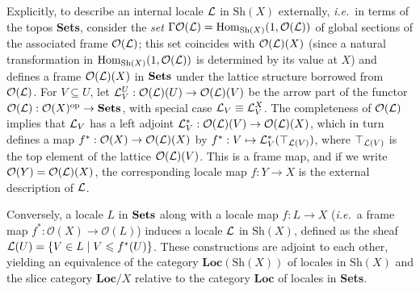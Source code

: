 \documentclass[11pt]{article}
\newcommand{\Sets}{\mbox{\textbf{Sets}}}
\newcommand{\raw}{\rightarrow} \newcommand{\rat}{\mapsto}
\newcommand{\CO}{{\mathcal O}} \newcommand{\CP}{{\mathcal P}}
\newcommand{\Sh}{\ensuremath{\mathrm{Sh}}}
\newcommand{\ie}{\textit{i.e.}}
\begin{document}
Explicitly,  to describe an internal locale ${\mathcal L}$ in $\Sh(X)$
externally, \ie\ in terms of the topos \Sets, consider the {\it set}
$\Gm\CO(\CL)=\mathrm{Hom}_{\Sh(X)}(1,\CO(\CL))$  of global sections of the
associated frame $\CO(\CL)$; this set coincides with $\CO(\CL)(X)$ 
(since a
natural transformation in $\mathrm{Hom}_{\Sh(X)}(1,\CO(\CL))$  is determined by its value at $X$)
and defines a frame $\CO(\CL)(X)$  in $\Sets$ under the lattice structure borrowed
from $\CO(\CL)$. For $V\subseteq U$, let $\CL^U_V:
\CO(\CL)(U)\raw \CO(\CL)(V)$ be the
arrow part of the functor $\CO(\CL):\CO(X)^{\mathrm{op}}\raw\Sets$, with
special case ${\mathcal L}_V\equiv{\mathcal L}^X_V$. The completeness of $\CO(\CL)$ implies
that ${\mathcal L}_V$ has a left adjoint $\CL^*_V:\CO(\CL)(V)\raw\CO(\CL)(X)$, which in
turn defines a map $f^*:\CO(X)\raw\CO(\CL)(X)$ by $f^*:V\mapsto
{\mathcal L}^*_V(\top_{{\mathcal L}(V)})$, where $\top_{{\mathcal L}(V)}$ is the top element of
the lattice $\CO(\CL)(V)$. This is a frame map, and if we write  $\CO(Y)=\CO(\CL)(X)$, the
corresponding locale
map $f: Y\raw X$  is the external description
of ${\mathcal L}$.

Conversely, a locale $L$ in $\Sets$ along with a
locale map $f:L\raw X$ (\ie\ a frame map $f^*:\CO(X)\raw \CO(L)$)
induces a locale ${\mathcal L}$ in $\Sh(X)$, defined as the sheaf
${\mathcal L}(U)=\{V\in L\mid V\leqslant f^*(U)\}$. These constructions are adjoint
to each other, yielding an equivalence of the category
$\mathbf{Loc}(\Sh(X))$ of locales in $\Sh(X)$ and the slice category
$\mathbf{Loc}/X$ relative to the category $\mathbf{Loc}$ of locales
in \Sets.
\end{document}
